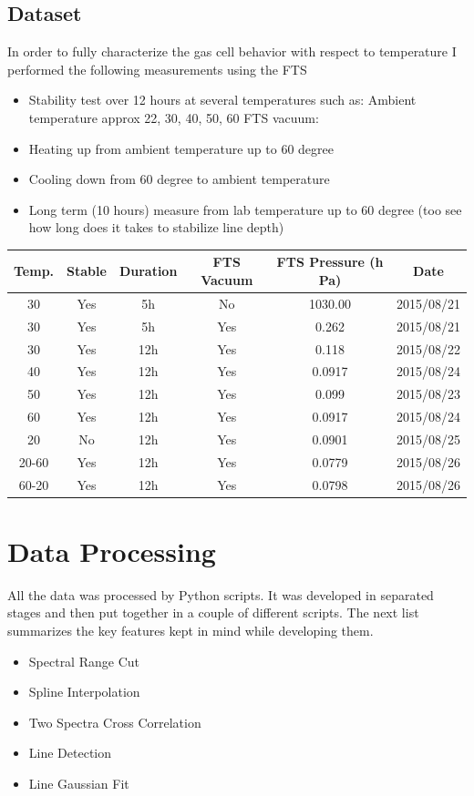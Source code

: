 \documentclass[master,       %
               twoside,        %
               BCOR10mm,       %
               ngerman,english  %
               ]{GAUBM_astro}
\begin{document}
\subsection{Dataset}
In order to fully characterize the gas cell behavior with respect to temperature I performed the following measurements using the FTS
\begin{itemize}
 \item Stability test over 12 hours at several temperatures such as: Ambient temperature approx 22, 30, 
40, 50, 60 FTS vacuum:
 \item Heating up from ambient temperature up to 60 degree
 \item Cooling down from 60 degree to ambient temperature
 \item Long term (10 hours) measure from lab temperature up to 60 degree (too see how long does it takes to stabilize 
line depth)
\end{itemize}
\begin{center}
\begin{tabular}{|c|c|c|c|c|c|}
\hline
Temp. & Stable & Duration & FTS Vacuum & FTS Pressure (h Pa) & Date\\
\hline
30 & Yes & 5h & No & 1030.00 & 2015/08/21\\
\hline
30 & Yes & 5h & Yes & 0.262 & 2015/08/21\\
\hline
30 & Yes & 12h & Yes & 0.118 & 2015/08/22\\
\hline
40 & Yes & 12h & Yes & 0.0917 & 2015/08/24\\
\hline           
50 & Yes & 12h & Yes & 0.099 &2015/08/23 \\
\hline          
60 & Yes & 12h & Yes & 0.0917 & 2015/08/24\\
\hline
20 & No & 12h & Yes& 0.0901 &2015/08/25 \\
\hline
20-60 & Yes & 12h & Yes & 0.0779 & 2015/08/26\\
\hline              
60-20 & Yes & 12h & Yes & 0.0798 &2015/08/26 \\
\hline
\end{tabular}
\end{center}


\section{Data Processing}
All the data was processed by Python scripts. It was developed in separated stages and then put together in a couple of different scripts. The next
list summarizes the key features kept in mind while developing them.
\begin{itemize}
 \item Spectral Range Cut
 \item Spline Interpolation
 \item Two Spectra Cross Correlation
 \item Line Detection
 \item Line Gaussian Fit
\end{itemize}
\end{document}
